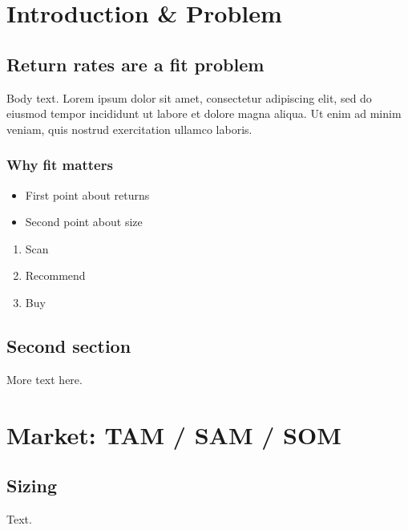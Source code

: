 \documentclass{closettwin}
\begin{document}
\frontmatter
\tableofcontents
\mainmatter
\chapter{Introduction \& Problem}
\section{Return rates are a fit problem}
Body text. Lorem ipsum dolor sit amet, consectetur adipiscing elit, sed do eiusmod tempor incididunt ut labore et dolore magna aliqua. Ut enim ad minim veniam, quis nostrud exercitation ullamco laboris.
\subsection{Why fit matters}
\begin{itemize}\item First point about returns \item Second point about size\end{itemize}
\begin{enumerate}\item Scan \item Recommend \item Buy\end{enumerate}
\section{Second section}
More text here.
\chapter{Market: TAM / SAM / SOM}
\section{Sizing}
Text.
\end{document}
